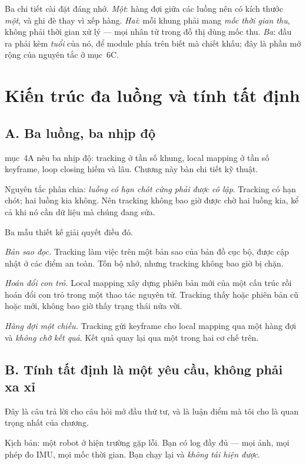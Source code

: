 \documentclass[../../vslam.tex]{subfiles}
\begin{document}
Ba chi tiết cài đặt đáng nhớ. \emph{Một}: hàng đợi giữa các luồng nên có kích thước \emph{một}, và ghi đè thay vì xếp hàng. \emph{Hai}: mỗi khung phải mang \emph{mốc thời gian thu}, không phải thời gian xử lý --- mọi nhân tử trong đồ thị dùng mốc thu. \emph{Ba}: đầu ra phải kèm \emph{tuổi} của nó, để module phía trên biết mà chiết khấu; đây là phần mở rộng của nguyên tắc ở  mục~6C.

\section{Kiến trúc đa luồng và tính tất định}

\subsection{A. Ba luồng, ba nhịp độ}

 mục~4A nêu ba nhịp độ: tracking ở tần số khung, local mapping ở tần số keyframe, loop closing hiếm và lâu. Chương này bàn chi tiết kỹ thuật.

Nguyên tắc phân chia: \emph{luồng có hạn chót cứng phải được cô lập}. Tracking có hạn chót; hai luồng kia không. Nên tracking không bao giờ được chờ hai luồng kia, kể cả khi nó cần dữ liệu mà chúng đang sửa.

Ba mẫu thiết kế giải quyết điều đó.

\emph{Bản sao đọc.} Tracking làm việc trên một bản sao của bản đồ cục bộ, được cập nhật ở các điểm an toàn. Tốn bộ nhớ, nhưng tracking không bao giờ bị chặn.

\emph{Hoán đổi con trỏ.} Local mapping xây dựng phiên bản mới của một cấu trúc rồi hoán đổi con trỏ trong một thao tác nguyên tử. Tracking thấy hoặc phiên bản cũ hoặc mới, không bao giờ thấy trạng thái nửa vời.

\emph{Hàng đợi một chiều.} Tracking gửi keyframe cho local mapping qua một hàng đợi và \emph{không chờ kết quả}. Kết quả quay lại qua một trong hai cơ chế trên.

\subsection{B. Tính tất định là một yêu cầu, không phải xa xỉ}

Đây là câu trả lời cho câu hỏi mở đầu thứ tư, và là luận điểm mà tôi cho là quan trọng nhất của chương.

Kịch bản: một robot ở hiện trường gặp lỗi. Bạn có log đầy đủ --- mọi ảnh, mọi phép đo IMU, mọi mốc thời gian. Bạn chạy lại và \emph{không tái hiện được}.
\end{document}
